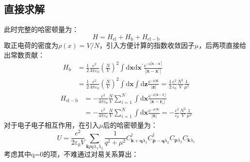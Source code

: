 \documentclass[10pt,openany]{book}
\theoremstyle{thmstyle} %
\theoremstyle{defstyle} %
\theoremstyle{prostyle} %
\begin{document}
\subsection*{直接求解}
此时完整的哈密顿量为：
\begin{equation}
	H=H_{\mathrm{el}}+H_{\mathrm{b}}+H_{\mathrm{el}-\mathrm{b}}
\end{equation} 
取正电荷的密度为$ \rho(x)=V/N $，引入方便计算的指数收敛因子$ \mu $，后两项直接给出常数贡献：
\begin{equation}
	\begin{aligned}
		H_{\mathrm{b}} & =\frac{1}{2} \frac{e^{2}}{4 \pi \varepsilon_{0}}\left(\frac{N}{V}\right)^{2} \int \mathrm{d} \boldsymbol{x} \mathrm{d} \boldsymbol{x}^{\prime} \frac{\mathrm{e}^{-\mu\left|\boldsymbol{x}-\boldsymbol{x}^{\prime}\right|}}{\left|\boldsymbol{x}-\boldsymbol{x}^{\prime}\right|} \\
		& =\frac{1}{2} \frac{e^{2}}{4 \pi \varepsilon_{0}}\left(\frac{N}{V}\right)^{2} \int \mathrm{d} \boldsymbol{x} \int \mathrm{d} \boldsymbol{z} \frac{\mathrm{e}^{-\mu|\boldsymbol{z}|}}{|\boldsymbol{z}|}=\frac{1}{2} \frac{e^{2}}{\varepsilon_{0}} \frac{N^{2}}{V} \frac{1}{\mu^{2}}
		\end{aligned}
\end{equation} 
\begin{equation}
	\begin{aligned}
		H_{\mathrm{el}-\mathrm{b}} & =-\frac{e^{2}}{4 \pi \varepsilon_{0}} \frac{N}{V} \sum_{i=1}^{N} \int \mathrm{d} \boldsymbol{x} \frac{ \mathrm{e}^{-\mu\left|\boldsymbol{x}-\boldsymbol{r}_{i}\right|}}{\left|\boldsymbol{x}-\boldsymbol{r}_{i}\right|} \\
		& =-\frac{e^{2}}{4 \pi \varepsilon_{0}} \frac{N}{V} \sum_{i=1}^{N} \int \mathrm{d} \boldsymbol{x} \frac{\mathrm{e}^{-\mu|\boldsymbol{x}|}}{|\boldsymbol{x}|}=-\frac{e^{2}}{\varepsilon_{0}} \frac{N^{2}}{V} \frac{1}{\mu^{2}}
		\end{aligned}
\end{equation}
对于电子电子相互作用，在引入$ \mu $后的哈密顿量为：
\begin{equation}
	U=\frac{e^2}{2 \varepsilon_0 V} \sum_{\boldsymbol{k} p q \lambda_1 \lambda_2} \frac{1}{q^2+\mu^2} C_{\boldsymbol{k}+\boldsymbol{q} \lambda_1}^{\dagger} C_{\boldsymbol{p}-\boldsymbol{q} \lambda_2}^{\dagger} C_{\boldsymbol{p} \lambda_2} C_{\boldsymbol{k} \lambda_1}
\end{equation} 
考虑其中q=0的项，不难通过对易关系算出：
\end{document}
